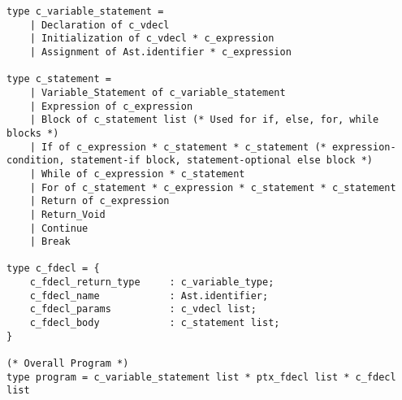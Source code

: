 \begin{verbatim}
type c_variable_statement = 
    | Declaration of c_vdecl
    | Initialization of c_vdecl * c_expression
    | Assignment of Ast.identifier * c_expression

type c_statement = 
    | Variable_Statement of c_variable_statement
    | Expression of c_expression
    | Block of c_statement list (* Used for if, else, for, while blocks *)
    | If of c_expression * c_statement * c_statement (* expression-condition, statement-if block, statement-optional else block *)
    | While of c_expression * c_statement
    | For of c_statement * c_expression * c_statement * c_statement
    | Return of c_expression
    | Return_Void
    | Continue
    | Break

type c_fdecl = {
    c_fdecl_return_type     : c_variable_type;
    c_fdecl_name        	: Ast.identifier;
    c_fdecl_params      	: c_vdecl list;    
    c_fdecl_body        	: c_statement list;
}

(* Overall Program *)
type program = c_variable_statement list * ptx_fdecl list * c_fdecl list
\end{verbatim}	